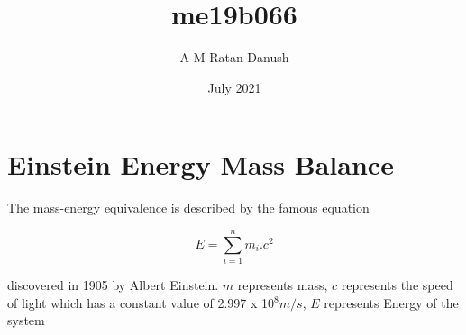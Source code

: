 \documentclass{article}
\title{me19b066}
\author{A M Ratan Danush}
\date{July 2021}
\begin{document}
\maketitle

\section{Einstein Energy Mass Balance}
The mass-energy equivalence is described by the famous equation

\[E=\sum_{i=1}^{n} m_i .c^2\]

discovered in 1905 by Albert Einstein. 
\vspace{1em}
\newline 
$m$ represents mass, $c$ represents the speed of light which has a constant value of 2.997 x 10$^8 m/s$, $E$ represents Energy of the system
\end{document}
